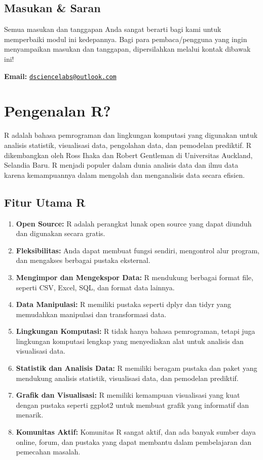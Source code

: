 \documentclass[
]{book}
\providecommand{\tightlist}{%
  \setlength{\itemsep}{0pt}\setlength{\parskip}{0pt}}
\begin{document}
\hypertarget{masukan-saran}{%
\section*{Masukan \& Saran}\label{masukan-saran}}

Semua masukan dan tanggapan Anda sangat berarti bagi kami untuk memperbaiki modul ini kedepannya. Bagi para pembaca/pengguna yang ingin menyampaikan masukan dan tanggapan, dipersilahkan melalui kontak dibawak ini!

\textbf{Email:} \href{mailto:dsciencelabs@outlook.com}{\nolinkurl{dsciencelabs@outlook.com}}

\hypertarget{pengenalan-r}{%
\chapter{Pengenalan R?}\label{pengenalan-r}}

R adalah bahasa pemrograman dan lingkungan komputasi yang digunakan untuk analisis statistik, visualisasi data, pengolahan data, dan pemodelan prediktif. R dikembangkan oleh Ross Ihaka dan Robert Gentleman di Universitas Auckland, Selandia Baru. R menjadi populer dalam dunia analisis data dan ilmu data karena kemampuannya dalam mengolah dan menganalisis data secara efisien.

\hypertarget{fitur-utama-r}{%
\section{Fitur Utama R}\label{fitur-utama-r}}

\begin{enumerate}
\def\labelenumi{\arabic{enumi}.}
\tightlist
\item
  \textbf{Open Source:} R adalah perangkat lunak open source yang dapat diunduh dan digunakan secara gratis.
\item
  \textbf{Fleksibilitas:} Anda dapat membuat fungsi sendiri, mengontrol alur program, dan mengakses berbagai pustaka eksternal.
\item
  \textbf{Mengimpor dan Mengekspor Data:} R mendukung berbagai format file, seperti CSV, Excel, SQL, dan format data lainnya.
\item
  \textbf{Data Manipulasi:} R memiliki pustaka seperti dplyr dan tidyr yang memudahkan manipulasi dan transformasi data.
\item
  \textbf{Lingkungan Komputasi:} R tidak hanya bahasa pemrograman, tetapi juga lingkungan komputasi lengkap yang menyediakan alat untuk analisis dan visualisasi data.
\item
  \textbf{Statistik dan Analisis Data:} R memiliki beragam pustaka dan paket yang mendukung analisis statistik, visualisasi data, dan pemodelan prediktif.
\item
  \textbf{Grafik dan Visualisasi:} R memiliki kemampuan visualisasi yang kuat dengan pustaka seperti ggplot2 untuk membuat grafik yang informatif dan menarik.
\item
  \textbf{Komunitas Aktif:} Komunitas R sangat aktif, dan ada banyak sumber daya online, forum, dan pustaka yang dapat membantu dalam pembelajaran dan pemecahan masalah.
\end{enumerate}
\end{document}
